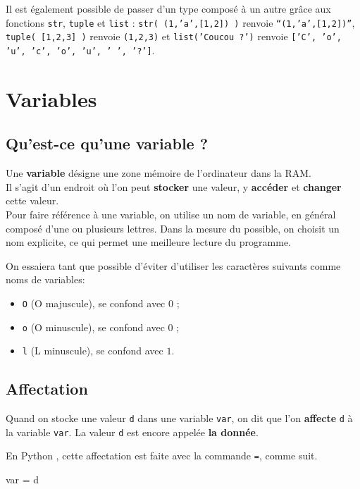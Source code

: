 Il est également possible de passer d'un type composé à un autre grâce aux fonctions \texttt{str}, 
\texttt{tuple} et \texttt{list} : \texttt{str( (1,'a',[1,2]) )} renvoie \texttt{``(1,'a',[1,2])''}, 
\texttt{tuple( [1,2,3] )} renvoie \texttt{(1,2,3)} et \texttt{list('Coucou ?')} renvoie 
\texttt{['C', 'o', 'u', 'c', 'o', 'u', ' ', '?']}.


\section{Variables}

\subsection{Qu'est-ce qu'une variable ?}

Une \textbf{variable} désigne une zone mémoire de l'ordinateur dans la RAM.\\
Il s'agit d'un endroit où l'on peut \textbf{stocker} une valeur, y \textbf{accéder} et 
\textbf{changer} cette valeur.\\

Pour faire référence à une variable, on utilise un nom de variable, en général composé d'une ou 
plusieurs lettres. Dans la mesure du possible, on choisit un nom explicite, ce qui permet une 
meilleure lecture du programme.

On essaiera tant que possible d'éviter d'utiliser les caractères suivants comme noms de variables:
\begin{itemize}
  \item \texttt{O} (O majuscule), se confond avec $0$ ;
  \item \texttt{o} (O minuscule), se confond avec $0$ ;
  \item \texttt{l} (L minuscule), se confond avec $1$. 
\end{itemize}


\subsection{Affectation}

Quand on stocke une valeur \texttt{d} dans une variable \texttt{var}, on dit que l'on 
\textbf{affecte} \texttt{d} à la variable \texttt{var}. La valeur
\texttt{d} est encore appelée \textbf{la donnée}.

En Python , cette affectation est faite avec la commande \texttt{=}, comme suit.  

\begin{pyconsole}
var  = d
\end{pyconsole}


